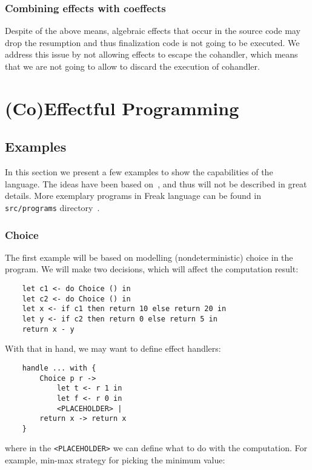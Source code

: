 \documentclass[declaration,shortabstract]{iithesis}
\theoremstyle{definition} \newtheorem{definition}{Definition}[chapter]
\theoremstyle{remark} \newtheorem{remark}[definition]{Observation}
\theoremstyle{plain} \newtheorem{theorem}[definition]{Theorem}
\theoremstyle{plain} \newtheorem{lemma}[definition]{Lemma}
\begin{document}
\subsection{Combining effects with coeffects}

Despite of the above means, algebraic effects that occur in the source code may
drop the resumption and thus finalization code is not going to be executed.
We address this issue by not allowing effects to escape the cohandler, which
means that we are not going to allow to discard the execution of cohandler.


\chapter{(Co)Effectful Programming}\label{chapter:co-effectful-programming}
\section{Examples}\label{sec:examples}

    In this section we present a few examples to show the capabilities of the language.
    The ideas have been based on~\cite{programming-in-eff}, and thus will not be
    described in great details. More exemplary programs in Freak language can
    be found in \verb!src/programs! directory~\cite{freak}.

    \subsection{Choice}\label{sec:choice-example}

    The first example will be based on modelling (nondeterministic) choice
    in the program. We will make two decisions, which will affect the computation
    result:

\begin{verbatim}
    let c1 <- do Choice () in
    let c2 <- do Choice () in
    let x <- if c1 then return 10 else return 20 in
    let y <- if c2 then return 0 else return 5 in
    return x - y
\end{verbatim}
    With that in hand, we may want to define effect handlers:

\begin{verbatim}
    handle ... with {
        Choice p r ->
            let t <- r 1 in
            let f <- r 0 in
            <PLACEHOLDER> |
        return x -> return x
    }
\end{verbatim}
    where in the \verb!<PLACEHOLDER>! we can define what to do with the
    computation. For example, min-max strategy for picking the minimum value:
\end{document}
